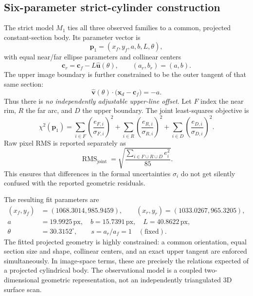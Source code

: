 \documentclass[11pt,letterpaper]{article}
\newcommand{\rms}{\operatorname{RMS}}
\newcommand{\px}{\,\mathrm{px}}
\newcommand{\mat}[1]{\mathbf{#1}}
\begin{document}
\subsection{Six-parameter strict-cylinder construction}
\label{sec:strict}

The strict model \(M_1\) ties all three observed families to a common, projected constant-section body. Its parameter vector is
\begin{equation}
 \mat p_1=(x_f,y_f,a,b,L,\theta),
\end{equation}
with equal near/far ellipse parameters and collinear centers
\begin{equation}
 \mat c_r=\mat c_f-L\hat{\mat u}(\theta),\qquad
 (a_r,b_r)=(a,b).
 \label{eq:axis}
\end{equation}
The upper image boundary is further constrained to be the outer tangent of that same section:
\begin{equation}
 \hat{\mat v}(\theta)\cdot\bigl(\mat x_d-\mat c_f\bigr)=-a.
 \label{eq:tangent}
\end{equation}
Thus there is \emph{no independently adjustable upper-line offset}. Let \(F\) index the near rim, \(R\) the far arc, and \(D\) the upper boundary. The joint least-squares objective is
\begin{equation}
 \chi^2(\mat p_1)=\sum_{i\in F}\left(\frac{e_{F,i}}{\sigma_{F,i}}\right)^2
 +\sum_{i\in R}\left(\frac{e_{R,i}}{\sigma_{R,i}}\right)^2
 +\sum_{i\in D}\left(\frac{e_{D,i}}{\sigma_{D,i}}\right)^2.
 \label{eq:loss}
\end{equation}
Raw pixel RMS is reported separately as
\begin{equation}
 \rms_{\mathrm{joint}}=\sqrt{\frac{\sum_{i\in F\cup R\cup D}e_i^2}{85}}.
 \label{eq:rms}
\end{equation}
This ensures that differences in the formal uncertainties \(\sigma_i\) do not get silently confused with the reported geometric residuals.

The resulting fit parameters are
\begin{equation}
\begin{aligned}
 (x_f,y_f)&=(1068.3014,985.9459),\qquad
 (x_r,y_r)=(1033.0267,965.3205),\\
 a&=19.9925\px,\quad b=15.7391\px,\quad
 L=40.8622\px,\\
 \theta&=30.3152^\circ,\qquad s=a_r/a_f=1\quad(\text{fixed}).
\end{aligned}
\end{equation}
The fitted projected geometry is highly constrained: a common orientation, equal section size and shape, collinear centers, and an exact upper tangent are enforced simultaneously. In image-space terms, these are precisely the relations expected of a projected cylindrical body. The observational model is a coupled two-dimensional geometric representation, not an independently triangulated 3D surface scan.
\end{document}
